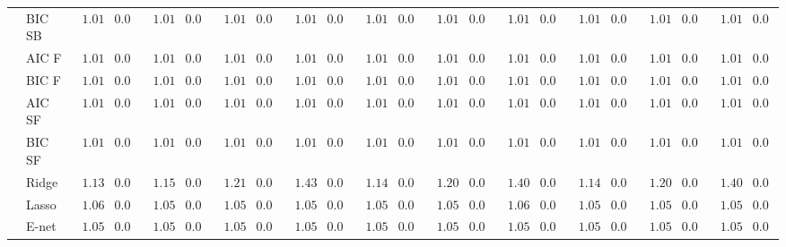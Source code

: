 \begin{tabular}{llllllllllllllllllllll}
	& BIC SB  & $\phantom{0}1.01$ & $0.04$ & $\phantom{0}1.01$ & $0.04$ & $\phantom{0}1.01$ & $0.04$ & $\phantom{0}1.01$ & $0.04$ & $\phantom{0}1.01$ & $0.04$ & $\phantom{0}1.01$ & $0.04$ & $\phantom{0}1.01$ & $0.04$ & $\phantom{0}1.01$ & $0.04$ & $\phantom{0}1.01$ & $0.04$ & $\phantom{0}1.01$ & $0.04$ \\
	& AIC F  & $\phantom{0}1.01$ & $0.04$ & $\phantom{0}1.01$ & $0.04$ & $\phantom{0}1.01$ & $0.04$ & $\phantom{0}1.01$ & $0.04$ & $\phantom{0}1.01$ & $0.04$ & $\phantom{0}1.01$ & $0.04$ & $\phantom{0}1.01$ & $0.04$ & $\phantom{0}1.01$ & $0.04$ & $\phantom{0}1.01$ & $0.04$ & $\phantom{0}1.01$ & $0.04$ \\
	& BIC F  & $\phantom{0}1.01$ & $0.04$ & $\phantom{0}1.01$ & $0.04$ & $\phantom{0}1.01$ & $0.04$ & $\phantom{0}1.01$ & $0.04$ & $\phantom{0}1.01$ & $0.04$ & $\phantom{0}1.01$ & $0.04$ & $\phantom{0}1.01$ & $0.04$ & $\phantom{0}1.01$ & $0.04$ & $\phantom{0}1.01$ & $0.04$ & $\phantom{0}1.01$ & $0.04$ \\
	& AIC SF  & $\phantom{0}1.01$ & $0.04$ & $\phantom{0}1.01$ & $0.04$ & $\phantom{0}1.01$ & $0.04$ & $\phantom{0}1.01$ & $0.04$ & $\phantom{0}1.01$ & $0.04$ & $\phantom{0}1.01$ & $0.04$ & $\phantom{0}1.01$ & $0.04$ & $\phantom{0}1.01$ & $0.04$ & $\phantom{0}1.01$ & $0.04$ & $\phantom{0}1.01$ & $0.04$ \\
	& BIC SF  & $\phantom{0}1.01$ & $0.04$ & $\phantom{0}1.01$ & $0.04$ & $\phantom{0}1.01$ & $0.04$ & $\phantom{0}1.01$ & $0.04$ & $\phantom{0}1.01$ & $0.04$ & $\phantom{0}1.01$ & $0.04$ & $\phantom{0}1.01$ & $0.04$ & $\phantom{0}1.01$ & $0.04$ & $\phantom{0}1.01$ & $0.04$ & $\phantom{0}1.01$ & $0.04$ \\
	& Ridge  & $\phantom{0}1.13$ & $0.06$ & $\phantom{0}1.15$ & $0.06$ & $\phantom{0}1.21$ & $0.06$ & $\phantom{0}1.43$ & $0.07$ & $\phantom{0}1.14$ & $0.06$ & $\phantom{0}1.20$ & $0.07$ & $\phantom{0}1.40$ & $0.06$ & $\phantom{0}1.14$ & $0.06$ & $\phantom{0}1.20$ & $0.06$ & $\phantom{0}1.40$ & $0.08$ \\
	& Lasso  & $\phantom{0}1.06$ & $0.05$ & $\phantom{0}1.05$ & $0.05$ & $\phantom{0}1.05$ & $0.05$ & $\phantom{0}1.05$ & $0.05$ & $\phantom{0}1.05$ & $0.05$ & $\phantom{0}1.05$ & $0.05$ & $\phantom{0}1.06$ & $0.05$ & $\phantom{0}1.05$ & $0.05$ & $\phantom{0}1.05$ & $0.05$ & $\phantom{0}1.05$ & $0.05$ \\
	& E-net  & $\phantom{0}1.05$ & $0.05$ & $\phantom{0}1.05$ & $0.05$ & $\phantom{0}1.05$ & $0.05$ & $\phantom{0}1.05$ & $0.05$ & $\phantom{0}1.05$ & $0.05$ & $\phantom{0}1.05$ & $0.05$ & $\phantom{0}1.05$ & $0.05$ & $\phantom{0}1.05$ & $0.05$ & $\phantom{0}1.05$ & $0.05$ & $\phantom{0}1.05$ & $0.05$ \\

\end{tabular}
